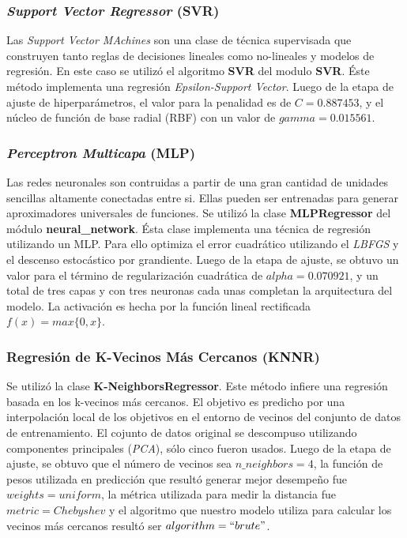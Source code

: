     \subsubsection{\textit{Support Vector Regressor} (SVR)}
      \par Las \textit{Support Vector MAchines} son una clase de técnica supervisada
        que construyen tanto reglas de decisiones lineales como no-lineales
        y modelos de regresión. En este caso se utilizó el algoritmo \textbf{SVR}
        del modulo \textbf{SVR}. Éste método implementa una regresión
        \textit{Epsilon-Support Vector}. Luego de la etapa de ajuste de
        hiperparámetros, el valor para la penalidad es de $C = 0.887453$, y
        el núcleo de función de base radial (RBF) con un valor de
        $gamma = 0.015561$.


    \subsubsection{\textit{Perceptron Multicapa} (MLP)}
      \par Las redes neuronales son contruidas a partir de una gran cantidad
        de unidades sencillas altamente conectadas entre si. Ellas pueden
        ser entrenadas para generar aproximadores universales de funciones.
        Se utilizó la clase \textbf{MLPRegressor} del módulo \textbf{neural\_network}.
        Ésta clase implementa una técnica de regresión utilizando un MLP. Para
        ello optimiza el error cuadrático utilizando el \textit{LBFGS} y
        el descenso estocástico por grandiente.
        Luego de la etapa de ajuste, se obtuvo un valor para el término
        de regularización cuadrática de $alpha = 0.070921$, y un total de
        tres capas y con tres neuronas cada unas completan la arquitectura
        del modelo. La activación es hecha por la función lineal
        rectificada $f(x) = max\{0, x\}$.


    \subsubsection{Regresión de K-Vecinos Más Cercanos (KNNR)}
      \par Se utilizó la clase \textbf{K-NeighborsRegressor}. Este método
        infiere una regresión basada en los k-vecinos más cercanos. El
        objetivo es predicho por una interpolación local de los objetivos
        en el entorno de vecinos del conjunto de datos de entrenamiento.
        El cojunto de datos original se descompuso utilizando componentes
        principales (\textit{PCA}), sólo cinco fueron usados. Luego de la etapa
        de ajuste, se obtuvo que el número de vecinos sea $n\_neighbors = 4$,
        la función de pesos utilizada en predicción que resultó generar mejor
        desempeño fue $weights = uniform$, la métrica utilizada para medir la
        distancia fue $metric = Chebyshev$ y el algoritmo que nuestro modelo
        utiliza para calcular los vecinos más cercanos resultó ser
        $algorithm = ``brute"$.

